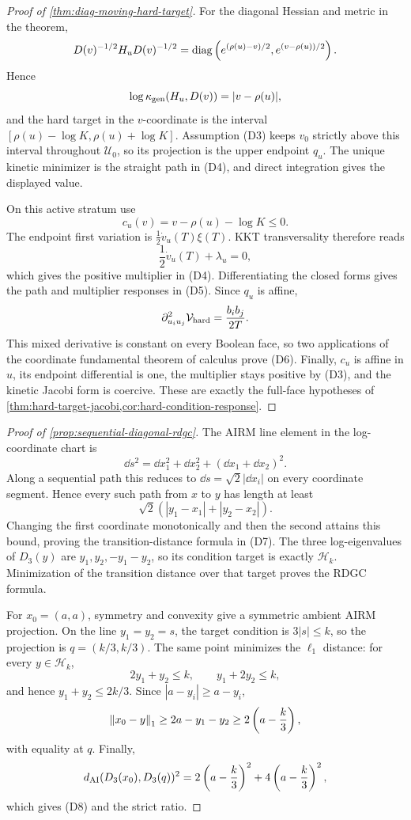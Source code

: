 \begin{proof}[Proof of \cref{thm:diag-moving-hard-target}]
For the diagonal Hessian and metric in the theorem,
\[
  D(v)^{-1/2}H_uD(v)^{-1/2}
  =\operatorname{diag}\left(e^{(\rho(u)-v)/2},e^{(v-\rho(u))/2}\right).
\]
Hence
\[
  \log\kappa_{\rm gen}(H_u,D(v))=|v-\rho(u)|,
\]
and the hard target in the \(v\)-coordinate is the interval
\([\rho(u)-\log K,\rho(u)+\log K]\).  Assumption \textup{(D3)} keeps
\(v_0\) strictly above this interval throughout \(\mathcal U_0\), so its
projection is the upper endpoint \(q_u\).  The unique kinetic minimizer is the
straight path in \textup{(D4)}, and direct integration gives the displayed
value.

On this active stratum use
\[
  c_u(v)=v-\rho(u)-\log K\le0.
\]
The endpoint first variation is
\(\frac12\dot v_u(T)\xi(T)\).  KKT transversality therefore reads
\[
  \frac12\dot v_u(T)+\lambda_u=0,
\]
which gives the positive multiplier in \textup{(D4)}.  Differentiating the
closed forms gives the path and multiplier responses in \textup{(D5)}.  Since
\(q_u\) is affine,
\[
  \partial_{u_i u_j}^2\mathcal V_{\rm hard}
  =\frac{b_i b_j}{2T}.
\]
This mixed derivative is constant on every Boolean face, so two applications
of the coordinate fundamental theorem of calculus prove \textup{(D6)}.
Finally, \(c_u\) is affine in \(u\), its endpoint differential is one, the
multiplier stays positive by \textup{(D3)}, and the kinetic Jacobi form is
coercive.  These are exactly the full-face hypotheses of
\cref{thm:hard-target-jacobi,cor:hard-condition-response}.
\end{proof}

\begin{proof}[Proof of \cref{prop:sequential-diagonal-rdgc}]
The AIRM line element in the log-coordinate chart is
\[
  \dd s^2
  =\dd x_1^2+\dd x_2^2+(\dd x_1+\dd x_2)^2.
\]
Along a sequential path this reduces to
\(\dd s=\sqrt2|\dd x_i|\) on every coordinate segment.  Hence every such
path from \(x\) to \(y\) has length at least
\[
  \sqrt2\left(
  |y_1-x_1|+|y_2-x_2|\right).
\]
Changing the first coordinate monotonically and then the second attains this
bound, proving the transition-distance formula in \textup{(D7)}.  The three
log-eigenvalues of \(D_3(y)\) are \(y_1,y_2,-y_1-y_2\), so its condition
target is exactly \(\mathcal H_k\).  Minimization of the transition distance
over that target proves the RDGC formula.

For \(x_0=(a,a)\), symmetry and convexity give a symmetric ambient AIRM
projection.  On the line \(y_1=y_2=s\), the target condition is
\(3|s|\le k\), so the projection is \(q=(k/3,k/3)\).  The same point minimizes
the \(\ell_1\) distance: for every \(y\in\mathcal H_k\),
\[
  2y_1+y_2\le k,
  \qquad
  y_1+2y_2\le k,
\]
and hence \(y_1+y_2\le2k/3\).  Since
\(|a-y_i|\ge a-y_i\),
\[
  \left\lVert x_0-y\right\rVert_1
  \ge2a-y_1-y_2
  \ge2\left(a-\frac{k}{3}\right),
\]
with equality at \(q\).  Finally,
\[
  d_{\mathrm{AI}}(D_3(x_0),D_3(q))^2
  =2\left(a-\frac{k}{3}\right)^2
   +4\left(a-\frac{k}{3}\right)^2,
\]
which gives \textup{(D8)} and the strict ratio.
\end{proof}


